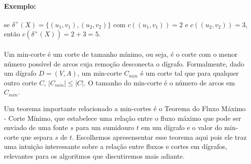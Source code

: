 \documentclass[12pt,a4paper]{article}
\begin{document}
\paragraph{Exemplo:} se \(\delta^+(X)=\{(u_1,v_1),(u_2,v_2)\}\) com \(c((u_1,v_1))=2\) e \(c((u_2,v_2))=3\), então \(c(\delta^+(X))=2+3=5\).

\paragraph{}
Um min-corte é um corte de tamanho mínimo, ou seja, é o corte com o menor número possível de arcos cuja remoção desconecta o dígrafo. Formalmente, dado um dígrafo \(D = (V, A)\), um min-corte \(C_{min}\) é um corte tal que para qualquer outro corte \(C\), \(|C_{min}| \leq |C|\). O tamanho do min-corte é o número de arcos em \(C_{min}\).

\begin{center}
\label{fig:min-corte}
\end{center}

Um teorema importante relacionado a min-cortes é o Teorema do Fluxo Máximo - Corte Mínimo, que estabelece uma relação entre o fluxo máximo que pode ser enviado de uma fonte \(s\) para um sumidouro \(t\) em um dígrafo e o valor do min-corte que separa \(s\) de \(t\). Escolhemos apresensentar esse teorema aqui pois ele traz uma intuição interessante sobre a relação entre fluxos e cortes em dígrafos, relevantes para os algoritmos que discutiremos mais adiante.
\end{document}
